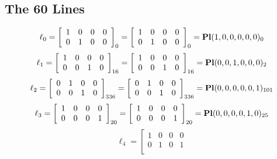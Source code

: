 \documentclass{article}
\begin{document}
{\subsection*{The 60 Lines}
$$
\ell_{0} = 
\left[
\begin{array}{*{4}{r}}
1 & 0 & 0 & 0\\
0 & 1 & 0 & 0\\
\end{array}
\right]
_{0}
=
\left[
\begin{array}{*{4}c}
1  & 0  & 0  & 0\\
0  & 1  & 0  & 0\\
\end{array}
\right]_{0}
={\rm\bf Pl}(1,0,0,0,0,0 )_{0}$$
$$
\ell_{1} = 
\left[
\begin{array}{*{4}{r}}
1 & 0 & 0 & 0\\
0 & 0 & 1 & 0\\
\end{array}
\right]
_{16}
=
\left[
\begin{array}{*{4}c}
1  & 0  & 0  & 0\\
0  & 0  & 1  & 0\\
\end{array}
\right]_{16}
={\rm\bf Pl}(0,0,1,0,0,0 )_{2}$$
$$
\ell_{2} = 
\left[
\begin{array}{*{4}{r}}
0 & 1 & 0 & 0\\
0 & 0 & 1 & 0\\
\end{array}
\right]
_{336}
=
\left[
\begin{array}{*{4}c}
0  & 1  & 0  & 0\\
0  & 0  & 1  & 0\\
\end{array}
\right]_{336}
={\rm\bf Pl}(0,0,0,0,0,1 )_{101}$$
$$
\ell_{3} = 
\left[
\begin{array}{*{4}{r}}
1 & 0 & 0 & 0\\
0 & 0 & 0 & 1\\
\end{array}
\right]
_{20}
=
\left[
\begin{array}{*{4}c}
1  & 0  & 0  & 0\\
0  & 0  & 0  & 1\\
\end{array}
\right]_{20}
={\rm\bf Pl}(0,0,0,0,1,0 )_{25}$$
$$
\ell_{4} = 
\left[
\begin{array}{*{4}{r}}
1 & 0 & 0 & 0\\
0 & 1 & 0 & 1\\
\end{array}
$$}
\end{document}
